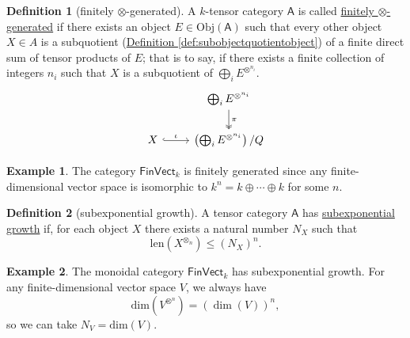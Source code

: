 \documentclass[a4paper,10pt]{scrreprt}
\newcommand{\defn}[1]{\ul{#1}}
\newcommand{\Obj}{\mathrm{Obj}}
\theoremstyle{definition}
\newtheorem{definition}{Definition}[section]
\newtheorem{example}{Example}[section]
\theoremstyle{plain}
\theoremstyle{remark}
\begin{document}
\begin{definition}[finitely $\otimes$-generated]
  \label{def:finitelygenerated}
  A $k$-tensor category $\mathsf{A}$ is called \defn{finitely $\otimes$-generated} if there exists an object $E \in \Obj(\mathsf{A})$ such that every other object $X \in A$ is a subquotient (\hyperref[def:subobjectquotientobject]{Definition \ref*{def:subobjectquotientobject}}) of a finite direct sum of tensor products of $E$; that is to say, if there exists a finite collection of integers $n_{i}$ such that $X$ is a subquotient of $\bigoplus_{i} E^{\otimes^{n_{i}}}$.
  \begin{equation*}
    \begin{tikzcd}
      & \bigoplus_{i} E^{\otimes^{n_{i}}}
      \arrow[d, twoheadrightarrow, "\pi"]
      \\
      X
      \arrow[r, hookrightarrow, "\iota"]
      & \left( \bigoplus_{i} E^{\otimes^{n_{i}}} \right) / Q
    \end{tikzcd}
  \end{equation*}
\end{definition}

\begin{example}
  The category $\mathsf{FinVect}_{k}$ is finitely generated since any finite-dimensional vector space is isomorphic to $k^{n} = k \oplus \cdots \oplus k$ for some $n$.
\end{example}

\begin{definition}[subexponential growth]
  \label{def:subexponentialgrowth}
  A tensor category $\mathsf{A}$ has \defn{subexponential growth} if, for each object $X$ there exists a natural number $N_{X}$ such that 
  \begin{equation*}
    \mathrm{len}(X^{\otimes_{n}}) \leq (N_{X})^{n}.
  \end{equation*}
\end{definition}

\begin{example}
  The monoidal category $\mathsf{FinVect}_{k}$ has subexponential growth. For any finite-dimensional vector space $V$, we always have 
  \begin{equation*}
    \mathrm{dim}(V^{\otimes^{n}}) = (\dim(V))^{n},
  \end{equation*}
  so we can take $N_{V} = \mathrm{dim}(V)$.
\end{example}
\end{document}

